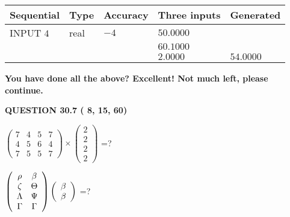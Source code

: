 \documentclass[12pt]{article}
\begin{document}
   
  
  
\noindent\begin{tabular}{|l|l|l|l|l|}
\hline
 Sequential & Type & Accuracy & Three inputs & Generated \\ 
\hline
 
 
  INPUT $           4$ & real & $          -4 $ & $
 50.0000
  $ & \\
  & & &  $
 60.1000
  $ & \\
  & & &  $
 2.0000
 $ & $ 54.0000 $ 
 \\  \hline  
 \end{tabular}
   
   
   
   
\vspace{0.3in}
{\textbf{\LARGE{You have done all the above? Excellent! Not much left, please continue.}}}
\vspace{0.3in}
   
   
  
\vspace{0.2in}
  
{\textbf{\Large{QUESTION
30.7 
 (          8,         15,         60)
}}}
  
  
 
$ \left( \begin{array}{ccccccccc}
           7 & 
           4 & 
           5 & 
           7 \\ 
           4 & 
           5 & 
           6 & 
           4 \\ 
           7 & 
           5 & 
           5 & 
           7
\end{array}\right) \times
\left( \begin{array}{c}
           2 \\ 
           2 \\ 
           2 \\ 
           2
\end{array}\right) $ =?
 
 
$  %
 \left( \begin{array}
 {
 c
 c
 }
 \rho & 
 \beta \\ 
                    \zeta & 
 \Theta \\ 
 \Lambda & 
 \Psi \\ 
 \Gamma & 
 \Gamma
 \end{array} \right)
 \left( \begin{array}
 {
 c
 }
 \beta \\ 
 \beta
 \end{array} \right)
$ =?
 
\end{document}
